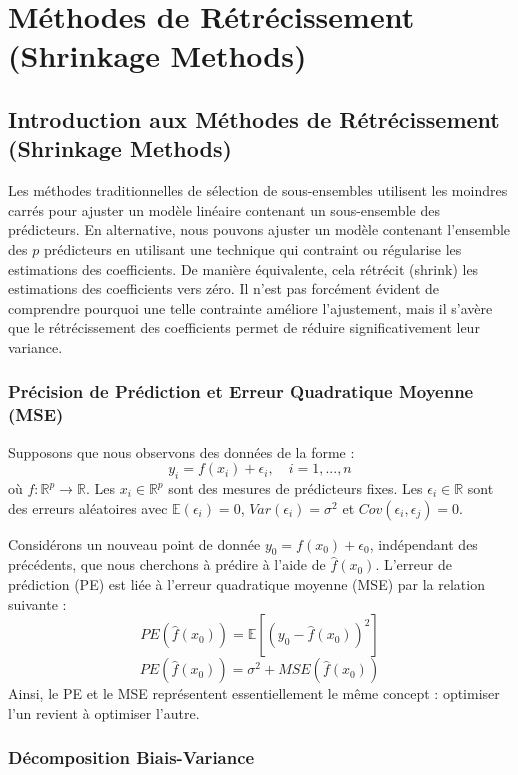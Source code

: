 \chapter{Méthodes de Rétrécissement (Shrinkage Methods)}
\section{Introduction aux Méthodes de Rétrécissement (Shrinkage Methods)}

Les méthodes traditionnelles de sélection de sous-ensembles utilisent les moindres carrés pour ajuster un modèle linéaire contenant un sous-ensemble des prédicteurs. 
En alternative, nous pouvons ajuster un modèle contenant l'ensemble des $p$ prédicteurs en utilisant une technique qui contraint ou régularise les estimations des coefficients. 
De manière équivalente, cela rétrécit (shrink) les estimations des coefficients vers zéro. 
Il n'est pas forcément évident de comprendre pourquoi une telle contrainte améliore l'ajustement, mais il s'avère que le rétrécissement des coefficients permet de réduire significativement leur variance.

\subsection{Précision de Prédiction et Erreur Quadratique Moyenne (MSE)}

Supposons que nous observons des données de la forme :
$$y_i = f(x_i) + \epsilon_i, \quad i=1,...,n$$ 
où $f : \mathbb{R}^p \rightarrow \mathbb{R}$. 
Les $x_i \in \mathbb{R}^p$ sont des mesures de prédicteurs fixes. 
Les $\epsilon_i \in \mathbb{R}$ sont des erreurs aléatoires avec $\mathbb{E}(\epsilon_i) = 0$, $Var(\epsilon_i) = \sigma^2$ et $Cov(\epsilon_i, \epsilon_j) = 0$.

Considérons un nouveau point de donnée $y_0 = f(x_0) + \epsilon_0$, indépendant des précédents, que nous cherchons à prédire à l'aide de $\hat{f}(x_0)$. 
L'erreur de prédiction (PE) est liée à l'erreur quadratique moyenne (MSE) par la relation suivante :
$$PE(\hat{f}(x_0)) = \mathbb{E}[(y_0 - \hat{f}(x_0))^2]$$ 
$$PE(\hat{f}(x_0)) = \sigma^2 + MSE(\hat{f}(x_0))$$ 
Ainsi, le PE et le MSE représentent essentiellement le même concept : optimiser l'un revient à optimiser l'autre.

\subsection{Décomposition Biais-Variance}

